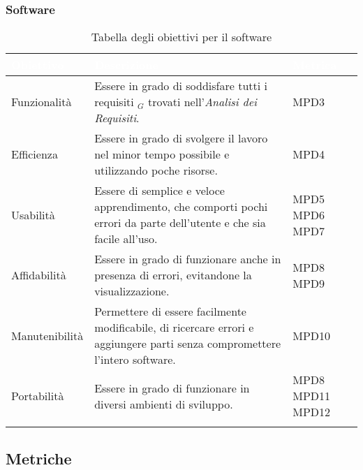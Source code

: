 \subsubsection{Software}
\begin{center}
  \renewcommand{\arraystretch}{1.25}
  \begin{longtable}{|p{3cm}|p{7.5cm}|p{2cm}|} \hline
    \rowcolor[HTML]{036400}
    \textcolor{white}{\textbf{Obiettivo}} & \textcolor{white}{\textbf{Descrizione}} & \textcolor{white}{\textbf{Metrica}}  \\ \hline
    \rowcolor[HTML]{EFEFEF}
    Funzionalità & Essere in grado di soddisfare tutti i requisiti $_G$ trovati nell'\textit{Analisi dei Requisiti}.  & MPD3       \\ \hline
    \rowcolor[HTML]{C0C0C0}
    Efficienza & Essere in grado di svolgere il lavoro nel minor tempo possibile e utilizzando poche risorse.   & MPD4       \\ \hline
    \rowcolor[HTML]{EFEFEF}
    Usabilità & Essere di semplice e veloce apprendimento, che comporti pochi errori da parte dell'utente e che sia facile all'uso.  & MPD5 \newline MPD6 \newline MPD7    \\ \hline
    \rowcolor[HTML]{C0C0C0}
    Affidabilità & Essere in grado di funzionare anche in presenza di errori, evitandone la visualizzazione.  & MPD8 \newline MPD9       \\ \hline
    \rowcolor[HTML]{EFEFEF}
    Manutenibilità & Permettere di essere facilmente modificabile, di ricercare errori e aggiungere parti senza compromettere l'intero software.  & MPD10       \\ \hline
    \rowcolor[HTML]{C0C0C0}
    Portabilità & Essere in grado di funzionare in diversi ambienti di sviluppo. & MPD8 \newline MPD11 \newline MPD12       \\ \hline
    \caption{Tabella degli obiettivi per il software}
  \end{longtable}
\end{center}


\subsection{Metriche}
